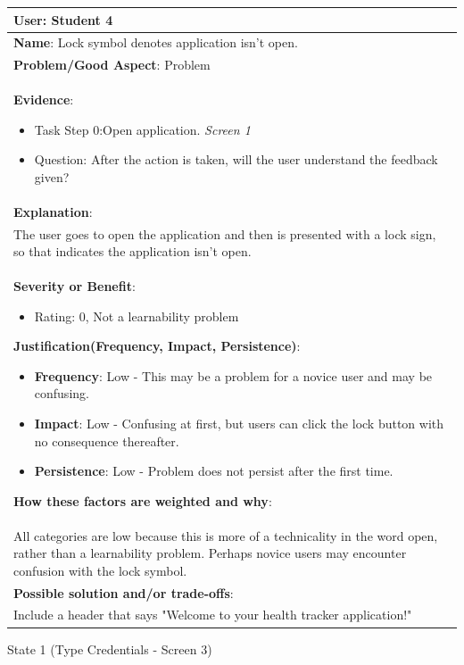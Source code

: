 \documentclass[pdftex,12pt,a4paper]{report}
\begin{document}
\begin{center}
	\begin{longtable}{|p{\textwidth}|}
	\hline
	\textbf{User}: Student 4\\
	\hline
	\textbf{Name}: Lock symbol denotes application isn't open.\\
	\hline
	\textbf{Problem/Good Aspect}: Problem\\
	\hline
	\textbf{Evidence}:
	\begin{itemize}
	\item{Task Step 0:Open application.  \textit{Screen 1}}
	\item{Question: After the action is taken, will the user understand the feedback given?}
	\end{itemize}\\
	\hline
	\textbf{Explanation}:\\
	The user goes to open the application and then is presented with a lock sign, so that indicates the application isn't open. \\
	\hline
	\textbf{Severity or Benefit}:
	\begin{itemize}
	\item{Rating: 0, Not a learnability problem}
	\end{itemize}
	\textbf{Justification(Frequency, Impact, Persistence)}:
	\begin{itemize}
	\item{\textbf{Frequency}:} Low - This may be a problem for a novice user and may be confusing.
	\item{\textbf{Impact}:} Low - Confusing at first, but users can click the lock button with no consequence thereafter.
	\item{\textbf{Persistence}:} Low - Problem does not persist after the first time.
	\end{itemize}
	\textbf{How these factors are weighted and why}:\\
	All categories are low because this is more of a technicality in the word open, rather than a learnability problem. Perhaps novice users may encounter confusion with the lock symbol.\\
	\hline
	\textbf{Possible solution and/or trade-offs}:\\
	Include a header that says "Welcome to your health tracker application!"\\
	\hline
	\end{longtable}
\end{center}

\begin{center}
State 1 (Type Credentials - Screen 3)
\end{center}
\end{document}
